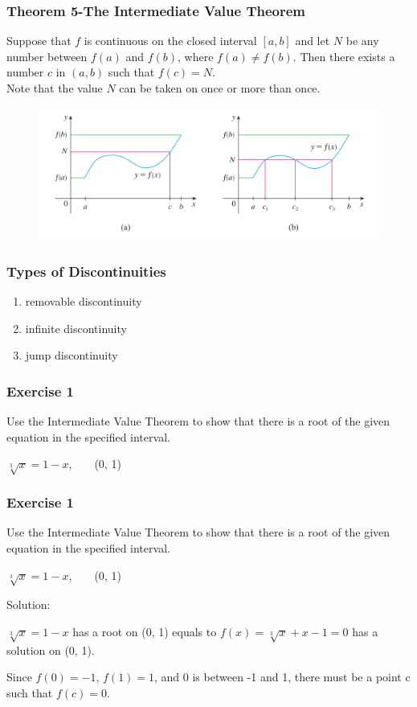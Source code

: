 \begin{frame}
    \frametitle{Theorem 5-The Intermediate Value Theorem}
    Suppose that \alert{$f$ is continuous on the closed interval $[a,b]$} and let $N$ be any number between $f(a)$ and $f(b)$, where $f(a) \neq f(b)$. Then there exists a number $c$ in $(a,b)$ such that $f(c) = N$.\\
    Note that the value $N$ can be taken on once or more than once.
    \begin{figure}
        \includegraphics[width=0.9\linewidth]{res/in.png}
    \end{figure}
\end{frame}
\begin{frame}
    \frametitle{Types of Discontinuities}
    \begin{enumerate}
        \item removable discontinuity
        \item infinite discontinuity
        \item jump discontinuity
    \end{enumerate}
\end{frame}
\begin{frame}
    \frametitle{Exercise 1}
    Use the Intermediate Value Theorem to show that there is a root of the given equation in the specified interval.
    \begin{center}
        $\sqrt[3]{x} = 1 - x$,\ \ \ \ (0, 1)
    \end{center}
\end{frame}

\begin{frame}
    \frametitle{Exercise 1}
    Use the Intermediate Value Theorem to show that there is a root of the given equation in the specified interval.
    \begin{center}
        $\sqrt[3]{x} = 1 - x$,\ \ \ \ (0, 1)
    \end{center}
    Solution:

    $\sqrt[3]{x} = 1 - x$ has a root on (0, 1) equals to $f(x) = \sqrt[3]{x} + x -1 = 0$ has a solution on (0, 1).

    Since $f(0) = -1$, $f(1) = 1$, and 0 is between -1 and 1, there must be a point c such that $f(c) = 0$.
\end{frame}

